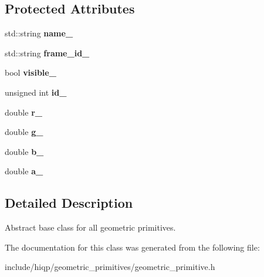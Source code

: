 \subsection*{Protected Attributes}
\begin{DoxyCompactItemize}
\item 
\hypertarget{classhiqp_1_1geometric__primitives_1_1GeometricPrimitive_a3c0b86477197e83a007864ab4bddf64d}{std\-::string {\bfseries name\-\_\-}}\label{classhiqp_1_1geometric__primitives_1_1GeometricPrimitive_a3c0b86477197e83a007864ab4bddf64d}

\item 
\hypertarget{classhiqp_1_1geometric__primitives_1_1GeometricPrimitive_adf47c6318853048d687374d6f75be69b}{std\-::string {\bfseries frame\-\_\-id\-\_\-}}\label{classhiqp_1_1geometric__primitives_1_1GeometricPrimitive_adf47c6318853048d687374d6f75be69b}

\item 
\hypertarget{classhiqp_1_1geometric__primitives_1_1GeometricPrimitive_a0f59fa89007d192bde05ca65df75a592}{bool {\bfseries visible\-\_\-}}\label{classhiqp_1_1geometric__primitives_1_1GeometricPrimitive_a0f59fa89007d192bde05ca65df75a592}

\item 
\hypertarget{classhiqp_1_1geometric__primitives_1_1GeometricPrimitive_a4ad5dff2d31d3a5dc407f5fb5d8188b8}{unsigned int {\bfseries id\-\_\-}}\label{classhiqp_1_1geometric__primitives_1_1GeometricPrimitive_a4ad5dff2d31d3a5dc407f5fb5d8188b8}

\item 
\hypertarget{classhiqp_1_1geometric__primitives_1_1GeometricPrimitive_a8459802c1669f64bf61189b89bd5c68d}{double {\bfseries r\-\_\-}}\label{classhiqp_1_1geometric__primitives_1_1GeometricPrimitive_a8459802c1669f64bf61189b89bd5c68d}

\item 
\hypertarget{classhiqp_1_1geometric__primitives_1_1GeometricPrimitive_a94108ca48b0d01d2d3df483561a802b3}{double {\bfseries g\-\_\-}}\label{classhiqp_1_1geometric__primitives_1_1GeometricPrimitive_a94108ca48b0d01d2d3df483561a802b3}

\item 
\hypertarget{classhiqp_1_1geometric__primitives_1_1GeometricPrimitive_ae74366f413fb40af4f8a48b297a1a79c}{double {\bfseries b\-\_\-}}\label{classhiqp_1_1geometric__primitives_1_1GeometricPrimitive_ae74366f413fb40af4f8a48b297a1a79c}

\item 
\hypertarget{classhiqp_1_1geometric__primitives_1_1GeometricPrimitive_af4bf3cef98a1257ba054234fd6acd5d4}{double {\bfseries a\-\_\-}}\label{classhiqp_1_1geometric__primitives_1_1GeometricPrimitive_af4bf3cef98a1257ba054234fd6acd5d4}

\end{DoxyCompactItemize}


\subsection{Detailed Description}
Abstract base class for all geometric primitives. 

The documentation for this class was generated from the following file\-:\begin{DoxyCompactItemize}
\item 
include/hiqp/geometric\-\_\-primitives/geometric\-\_\-primitive.\-h\end{DoxyCompactItemize}
